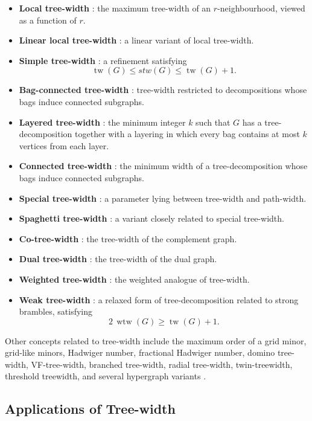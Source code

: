 \documentclass[10pt]{book}
\theoremstyle{definition}
\begin{document}
\begin{itemize}
    \item \textbf{Local tree-width} \cite{45}: the maximum tree-width of an \(r\)-neighbourhood, viewed as a function of \(r\).
    \item \textbf{Linear local tree-width} \cite{dujmovic2013layered,45}: a linear variant of local tree-width.
    \item \textbf{Simple tree-width} \cite{knauer2012simple}: a refinement satisfying
    \[
    \operatorname{tw}(G)\leq stw(G)\leq \operatorname{tw}(G)+1.
    \]
    \item \textbf{Bag-connected tree-width} \cite{138}: tree-width restricted to decompositions whose bags induce connected subgraphs.
    \item \textbf{Layered tree-width} \cite{157,159}: the minimum integer \(k\) such that \(G\) has a tree-decomposition together with a layering in which every bag contains at most \(k\) vertices from each layer.
    \item \textbf{Connected tree-width} \cite{181,183}: the minimum width of a tree-decomposition whose bags induce connected subgraphs.
    \item \textbf{Special tree-width} \cite{185}: a parameter lying between tree-width and path-width.
    \item \textbf{Spaghetti tree-width} \cite{226,315}: a variant closely related to special tree-width.
    \item \textbf{Co-tree-width} \cite{193}: the tree-width of the complement graph.
    \item \textbf{Dual tree-width} \cite{425}: the tree-width of the dual graph.
    \item \textbf{Weighted tree-width} \cite{kammer2016approximate}: the weighted analogue of tree-width.
    \item \textbf{Weak tree-width} \cite{amini2016spectral}: a relaxed form of tree-decomposition related to strong brambles, satisfying
    \[
    2\,\operatorname{wtw}(G)\geq \operatorname{tw}(G)+1.
    \]
\end{itemize}

Other concepts related to tree-width include the maximum order of a grid minor, grid-like minors, Hadwiger number, fractional Hadwiger number, domino tree-width, VF-tree-width, branched tree-width, radial tree-width, twin-treewidth, threshold treewidth, and several hypergraph variants
\cite{harvey2014treewidth,read1968use,bonnet2021metric}.

\subsection{Applications of Tree-width}
\end{document}
